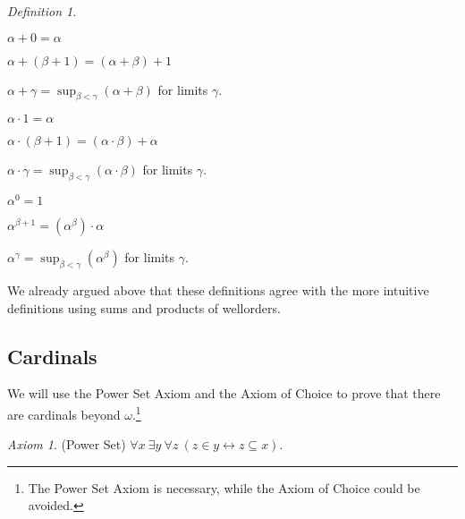 \documentclass[a4paper, 11pt]{amsart}
\theoremstyle{remark}
\newtheorem{definition}[definition]{Definition}
\newtheorem*{axiom}{Axiom}
\newenvironment{enumerate-(a)}{\begin{enumerate}[label={\upshape (\alph*)}, leftmargin=2pc]}{\end{enumerate}}
\newenvironment{enumerate-(1)}{\begin{enumerate}[label={\upshape (\arabic*)}, leftmargin=2pc]}{\end{enumerate}}
\begin{document}
\begin{definition} \ 
\begin{enumerate-(1)} 
\item 
\begin{enumerate-(a)} 
\item 
$\alpha + 0=\alpha$ 
\item 
$\alpha + (\beta+1)= (\alpha+ \beta)+1$ 
\item 
$\alpha + \gamma= \sup_{\beta<\gamma} (\alpha+ \beta)$ for limits $\gamma$. 
\end{enumerate-(a)} 

\item 
\begin{enumerate-(a)} 
\item 
$\alpha \cdot 1=\alpha$ 
\item 
$\alpha\cdot (\beta+1)= (\alpha\cdot \beta)+\alpha$ 
\item 
$\alpha\cdot \gamma= \sup_{\beta<\gamma} (\alpha\cdot \beta)$ for limits $\gamma$. 
\end{enumerate-(a)} 

\item 
\begin{enumerate-(a)} 
\item 
$\alpha^0=1$ 
\item 
$\alpha^{\beta+1}= (\alpha^\beta)\cdot\alpha$ 
\item 
$\alpha^\gamma= \sup_{\beta<\gamma} (\alpha^\beta)$ for limits $\gamma$. 
\end{enumerate-(a)} 
\end{enumerate-(1)} 
\end{definition} 

We already argued above that these definitions agree with the more intuitive definitions using sums and products of wellorders. 






\subsection{Cardinals} 

We will use the Power Set Axiom and the Axiom of Choice to prove that there are cardinals beyond $\omega$.\footnote{The Power Set Axiom is necessary, while the Axiom of Choice could be avoided.} 

\begin{axiom}(Power Set) 
$\forall x\ \exists y\ \forall z\ (z\in y \leftrightarrow z\subseteq x)$. 
\end{axiom} 
\end{document}
